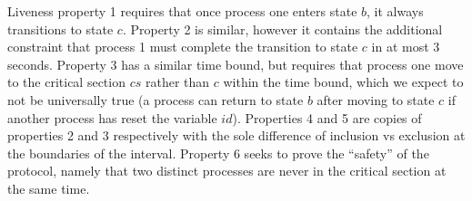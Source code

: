 \documentclass[a4paper,11pt]{report}
\theoremstyle{definition}
\begin{document}
Liveness property 1 requires that once process one enters state \(b\), it always
transitions to state \(c\). Property 2 is similar, however it contains the
additional constraint that process 1 must complete the transition to state \(c\)
in at most 3 seconds. Property 3 has a similar time bound, but requires that
process one move to the critical section \(cs\) rather than \(c\) within the
time bound, which we expect to not be universally true (a process can return to
state \(b\) after moving to state \(c\) if another process has reset the
variable \(id\)). Properties 4 and 5 are copies of properties 2 and 3
respectively with the sole difference of inclusion vs exclusion at the
boundaries of the interval. Property 6 seeks to prove the ``safety'' of the
protocol, namely that two distinct processes are never in the critical section
at the same time.
\end{document}
